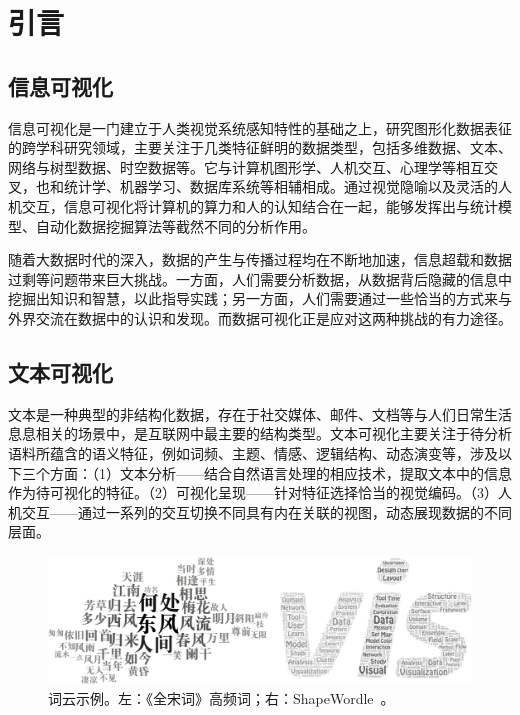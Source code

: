 \chapter{引言}

\section{信息可视化}
信息可视化是一门建立于人类视觉系统感知特性的基础之上，研究图形化数据表征的跨学科研究领域，主要关注于几类特征鲜明的数据类型，包括多维数据、文本、网络与树型数据、时空数据等。它与计算机图形学、人机交互、心理学等相互交叉，也和统计学、机器学习、数据库系统等相辅相成。通过视觉隐喻以及灵活的人机交互，信息可视化将计算机的算力和人的认知结合在一起，能够发挥出与统计模型、自动化数据挖掘算法等截然不同的分析作用。

随着大数据时代的深入，数据的产生与传播过程均在不断地加速，信息超载和数据过剩等问题带来巨大挑战。一方面，人们需要分析数据，从数据背后隐藏的信息中挖掘出知识和智慧，以此指导实践；另一方面，人们需要通过一些恰当的方式来与外界交流在数据中的认识和发现。而数据可视化正是应对这两种挑战的有力途径。



\section{文本可视化}

文本是一种典型的非结构化数据，存在于社交媒体、邮件、文档等与人们日常生活息息相关的场景中，是互联网中最主要的结构类型。文本可视化主要关注于待分析语料所蕴含的语义特征，例如词频、主题、情感、逻辑结构、动态演变等，涉及以下三个方面：（1）文本分析——结合自然语言处理的相应技术，提取文本中的信息作为待可视化的特征。（2）可视化呈现——针对特征选择恰当的视觉编码。（3）人机交互——通过一系列的交互切换不同具有内在关联的视图，动态展现数据的不同层面。

\begin{figure}[htbp]
	\centering
	\includegraphics[width=\textwidth]{figures/wordle_example.png}
	\caption{词云示例。左：《全宋词》高频词\protect\footnotemark；右：ShapeWordle~\supercite{Wang2020}。}
	\label{fig:wordle_example}
\end{figure}

